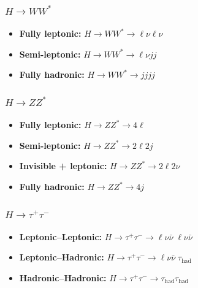 \documentclass[12pt]{article}
\begin{document}
        \subsubsection{\texorpdfstring{$H \to WW^*$}{H to WW}}%
        \label{subs:h_to_ww}
            \begin{itemize}
                \item \textbf{Fully leptonic:} $H \to WW^* \to \ell\nu \ell\nu$
                \item \textbf{Semi-leptonic:} $H \to WW^* \to \ell\nu jj$
                \item \textbf{Fully hadronic:} $H \to WW^* \to jjjj$
            \end{itemize}
        \subsubsection{\texorpdfstring{$H \to ZZ^*$}{H to ZZ}}%
        \label{subs:h_to_zz}
            \begin{itemize}
                \item \textbf{Fully leptonic:} $H \to ZZ^* \to 4\ell$
                \item \textbf{Semi-leptonic:} $H \to ZZ^* \to 2\ell 2j$
                \item \textbf{Invisible + leptonic:} $H \to ZZ^* \to 2\ell 2\nu$
                \item \textbf{Fully hadronic:} $H \to ZZ^* \to 4j$
            \end{itemize}
        \subsubsection{\texorpdfstring{$H \to \tau^+\tau^-$}{H to tau tau}}%
        \label{subs:h_to_tau_tau}
            \begin{itemize}
                \item \textbf{Leptonic--Leptonic:} $H \to \tau^+ \tau^- \to \ell \nu \bar{\nu} \; \ell \nu \bar{\nu}$
                \item \textbf{Leptonic--Hadronic:} $H \to \tau^+ \tau^- \to \ell \nu \bar{\nu} \; \tau_{\text{had}}$
                \item \textbf{Hadronic--Hadronic:} $H \to \tau^+ \tau^- \to \tau_{\text{had}} \tau_{\text{had}}$
            \end{itemize}
        
\end{document}
